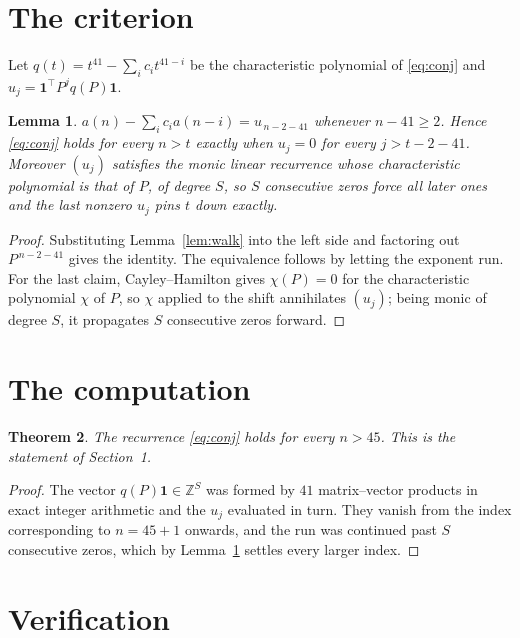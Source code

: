 \documentclass[11pt,a4paper]{article}
\theoremstyle{plain}
\newtheorem{theorem}{Theorem}
\newtheorem{lemma}[theorem]{Lemma}
\theoremstyle{definition}
\begin{document}
\section{The criterion}

Let $q(t)=t^{41}-\sum_i c_i t^{41-i}$ be the characteristic polynomial of
\eqref{eq:conj} and $u_j=\mathbf{1}^{\!\top}P^{j}q(P)\mathbf{1}$.

\begin{lemma}\label{lem:crit}
$a(n)-\sum_i c_i a(n-i)=u_{\,n-2-41}$ whenever $n-41\ge2$. Hence
\eqref{eq:conj} holds for every $n>t$ exactly when $u_j=0$ for every
$j>t-2-41$. Moreover $(u_j)$ satisfies the monic linear recurrence whose
characteristic polynomial is that of $P$, of degree $S$, so $S$ consecutive zeros force all
later ones and the last nonzero $u_j$ pins $t$ down exactly.
\end{lemma}

\begin{proof}
Substituting Lemma~\ref{lem:walk} into the left side and factoring out
$P^{\,n-2-41}$ gives the identity. The equivalence follows by letting the exponent
run. For the last claim, Cayley--Hamilton gives $\chi(P)=0$ for the characteristic
polynomial $\chi$ of $P$, so $\chi$ applied to the shift annihilates $(u_j)$; being monic of
degree $S$, it propagates $S$ consecutive zeros forward.
\end{proof}

\section{The computation}

\begin{theorem}
The recurrence \eqref{eq:conj} holds for every $n>45$. This is the statement of
Section~1.
\end{theorem}

\begin{proof}
The vector $q(P)\mathbf{1}\in\mathbb{Z}^{S}$ was formed by $41$ matrix--vector
products in exact integer arithmetic and the $u_j$ evaluated in turn. They vanish from the
index corresponding to $n=45+1$ onwards, and the run was continued past $S$ consecutive
zeros, which by Lemma~\ref{lem:crit} settles every larger index.
\end{proof}

\section{Verification}
\end{document}
